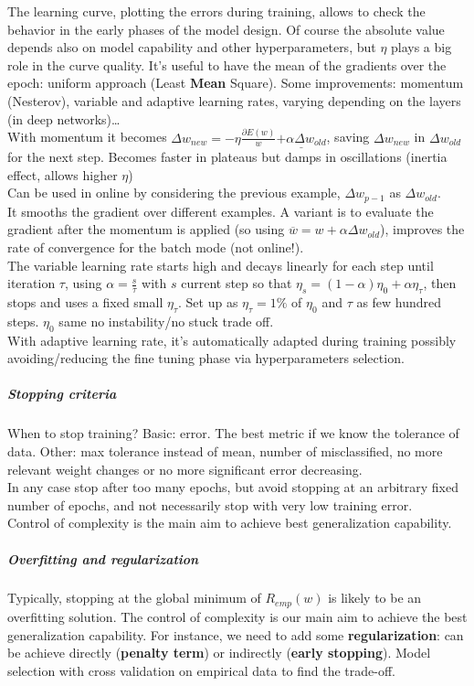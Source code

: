 \documentclass[10pt]{report}
\begin{document}
The learning curve, plotting the errors during training, allows to check the behavior in the early phases of the model design. Of course the absolute value depends also on model capability and other hyperparameters, but $\eta$ plays a big role in the curve quality. It's useful to have the mean of the gradients over the epoch: uniform approach (Least \textbf{Mean} Square). Some improvements: momentum (Nesterov), variable and adaptive learning rates, varying depending on the layers (in deep networks)\ldots\\
With momentum it becomes $\Delta w_{new} = -\eta\frac{\partial E(w)}{w} \underline{+ \alpha\Delta w_{old}}$, saving $\Delta w_{new}$ in $\Delta w_{old}$ for the next step. Becomes faster in plateaus but damps in oscillations (inertia effect, allows higher $\eta$)\\
Can be used in online by considering the previous example, $\Delta w_{p-1}$ as $\Delta w_{old}$.\\
It smooths the gradient over different examples. A variant is to evaluate the gradient after the momentum is applied (so using $\overline{w} = w + \alpha\Delta w_{old}$), improves the rate of convergence for the batch mode (not online!).\\
The variable learning rate starts high and decays linearly for each step until iteration $\tau$, using $\alpha = \frac{s}{\tau}$ with $s$ current step so that $\eta_s = (1-\alpha)\eta_0 + \alpha\eta_\tau$, then stops and uses a fixed small $\eta_\tau$. Set up as $\eta_\tau = 1\%$ of $\eta_0$ and $\tau$ as few hundred steps. $\eta_0$ same no instability/no stuck trade off.\\
With adaptive learning rate, it's automatically adapted during training possibly avoiding/reducing the fine tuning phase via hyperparameters selection.
\subparagraph{Stopping criteria} When to stop training? Basic: error. The best metric if we know the tolerance of data. Other: max tolerance instead of mean, number of misclassified, no more relevant weight changes or no more significant error decreasing.\\
In any case stop after too many epochs, but avoid stopping at an arbitrary fixed number of epochs, and not necessarily stop with very low training error.\\
Control of complexity is the main aim to achieve best generalization capability.
\subparagraph{Overfitting and regularization} Typically, stopping at the global minimum of $R_{emp}(w)$ is likely to be an overfitting solution. The control of complexity is our main aim to achieve the best generalization capability. For instance, we need to add some \textbf{regularization}: can be achieve directly (\textbf{penalty term}) or indirectly (\textbf{early stopping}). Model selection with cross validation on empirical data to find the trade-off.\\
\end{document}
